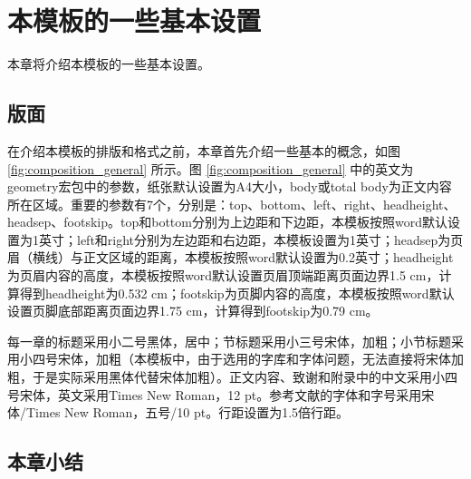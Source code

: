 \chapter{本模板的一些基本设置}
\label{cha:format}
本章将介绍本模板的一些基本设置。
\section{版面}
\label{sec:composition}
在介绍本模板的排版和格式之前，本章首先介绍一些基本的概念，如图 \ref{fig:composition_general} 所示。图 \ref{fig:composition_general} 中的英文为geometry宏包中的参数，纸张默认设置为A4大小，body或total body为正文内容所在区域。重要的参数有7个，分别是：top、bottom、left、right、headheight、headsep、footskip。top和bottom分别为上边距和下边距，本模板按照word默认设置为1英寸；left和right分别为左边距和右边距，本模板设置为1英寸；headsep为页眉（横线）与正文区域的距离，本模板按照word默认设置为0.2英寸；headheight为页眉内容的高度，本模板按照word默认设置页眉顶端距离页面边界1.5 cm，计算得到headheight为0.532 cm；footskip为页脚内容的高度，本模板按照word默认设置页脚底部距离页面边界1.75 cm，计算得到footskip为0.79 cm。


每一章的标题采用小二号黑体，居中；节标题采用小三号宋体，加粗；小节标题采用小四号宋体，加粗（本模板中，由于选用的字库和字体问题，无法直接将宋体加粗，于是实际采用黑体代替宋体加粗）。正文内容、致谢和附录中的中文采用小四号宋体，英文采用Times New Roman，12 pt。参考文献的字体和字号采用宋体/Times New Roman，五号/10 pt。行距设置为1.5倍行距。

\section{本章小结}

